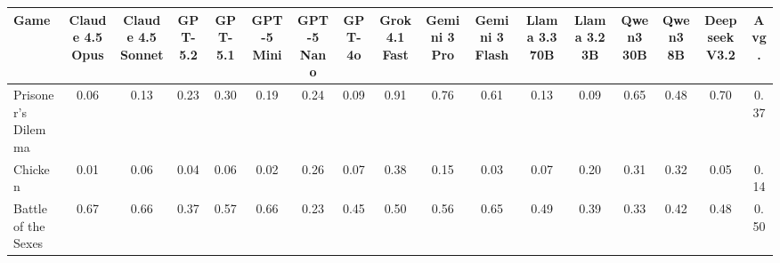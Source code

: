 
\begin{table}[htbp]
\centering
\renewcommand{\arraystretch}{2}
\footnotesize
\begin{adjustbox}{max width=\textwidth}
\begin{tabular}{lccccccccccccccc|c}
\toprule
\textbf{Game} & \textbf{\scriptsize Claude 4.5 Opus} & \textbf{\scriptsize Claude 4.5 Sonnet} & \textbf{\scriptsize GPT-5.2} & \textbf{\scriptsize GPT-5.1} & \textbf{\scriptsize GPT-5 Mini} & \textbf{\scriptsize GPT-5 Nano} & \textbf{\scriptsize GPT-4o} & \textbf{\scriptsize Grok 4.1 Fast} & \textbf{\scriptsize Gemini 3 Pro} & \textbf{\scriptsize Gemini 3 Flash} & \textbf{\scriptsize Llama 3.3 70B} & \textbf{\scriptsize Llama 3.2 3B} & \textbf{\scriptsize Qwen3 30B} & \textbf{\scriptsize Qwen3 8B} & \textbf{\scriptsize Deepseek V3.2} & \textbf{\scriptsize Avg.} \\
\midrule
Prisoner's Dilemma & \cellcolor[HTML]{DB4838}0.06 & \cellcolor[HTML]{E1674F}0.13 & \cellcolor[HTML]{E9906D}0.23 & \cellcolor[HTML]{EEAB81}0.30 & \cellcolor[HTML]{E67F61}0.19 & \cellcolor[HTML]{EA936F}0.24 & \cellcolor[HTML]{DE5542}0.09 & \cellcolor[HTML]{41A963}0.91 & \cellcolor[HTML]{88C985}0.76 & \cellcolor[HTML]{CCE8A6}0.61 & \cellcolor[HTML]{E1654E}0.13 & \cellcolor[HTML]{DE5441}0.09 & \cellcolor[HTML]{BBE09E}0.65 & \cellcolor[HTML]{FDF7B9}0.48 & \cellcolor[HTML]{A5D693}0.70 & \cellcolor[HTML]{F4C997}0.37 \\
Chicken & \cellcolor[HTML]{D8362B}0.01 & \cellcolor[HTML]{DB4738}0.06 & \cellcolor[HTML]{D93F32}0.04 & \cellcolor[HTML]{DB4637}0.06 & \cellcolor[HTML]{D8382D}0.02 & \cellcolor[HTML]{EB9A75}0.26 & \cellcolor[HTML]{DC4D3C}0.07 & \cellcolor[HTML]{F5CB99}0.38 & \cellcolor[HTML]{E26D54}0.15 & \cellcolor[HTML]{D93C30}0.03 & \cellcolor[HTML]{DC4D3C}0.07 & \cellcolor[HTML]{E78364}0.20 & \cellcolor[HTML]{EFB085}0.31 & \cellcolor[HTML]{F0B589}0.32 & \cellcolor[HTML]{DB4536}0.05 & \cellcolor[HTML]{E16750}0.14 \\
Battle of the Sexes & \cellcolor[HTML]{AEDB98}0.67 & \cellcolor[HTML]{B5DD9B}0.66 & \cellcolor[HTML]{F4C997}0.37 & \cellcolor[HTML]{DFF0AF}0.57 & \cellcolor[HTML]{B4DD9A}0.66 & \cellcolor[HTML]{E9906D}0.23 & \cellcolor[HTML]{FAE9AE}0.45 & \cellcolor[HTML]{FEFDBE}0.50 & \cellcolor[HTML]{E1F1B0}0.56 & \cellcolor[HTML]{B9DF9D}0.65 & \cellcolor[HTML]{FEFABB}0.49 & \cellcolor[HTML]{F6D19D}0.39 & \cellcolor[HTML]{F1B88B}0.33 & \cellcolor[HTML]{F8DCA5}0.42 & \cellcolor[HTML]{FDF5B7}0.48 & \cellcolor[HTML]{FEFDBD}0.50 \\

\end{tabular}
\end{adjustbox}
\end{table}
